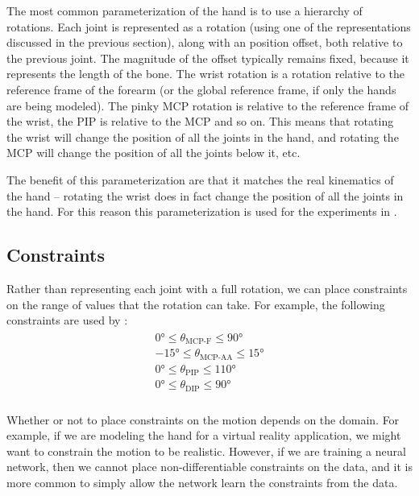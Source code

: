 The most common parameterization of the hand is to use a hierarchy of rotations. Each joint is represented as a rotation (using one of the representations discussed in the previous section), along with an position offset, both relative to the previous joint. The magnitude of the offset typically remains fixed, because it represents the length of the bone. The wrist rotation is a rotation relative to the reference frame of the forearm (or the global reference frame, if only the hands are being modeled). The pinky MCP rotation is relative to the reference frame of the wrist, the PIP is relative to the MCP and so on. This means that rotating the wrist will change the position of all the joints in the hand, and rotating the MCP will change the position of all the joints below it, etc.

The benefit of this parameterization are that it matches the real kinematics of the hand -- rotating the wrist does in fact change the position of all the joints in the hand. For this reason this parameterization is used for the experiments in .

\subsection{Constraints}

Rather than representing each joint with a full rotation, we can place constraints on the range of values that the rotation can take. For example, the following constraints are used by \cite{hand-constraints}:
\begin{align}
\label{eqn:constraints}
\begin{aligned}
    0° ≤ \theta_{\text{MCP-F}} ≤ 90° \\
    -15° ≤ \theta_{\text{MCP-AA}} ≤ 15° \\
    0° ≤ \theta_{\text{PIP}} ≤ 110° \\
    0° ≤ \theta_{\text{DIP}} ≤ 90° \\
\end{aligned}
\end{align}

Whether or not to place constraints on the motion depends on the domain. For example, if we are modeling the hand for a virtual reality application, we might want to constrain the motion to be realistic. However, if we are training a neural network, then we cannot place non-differentiable constraints on the data, and it is more common to simply allow the network learn the constraints from the data.

